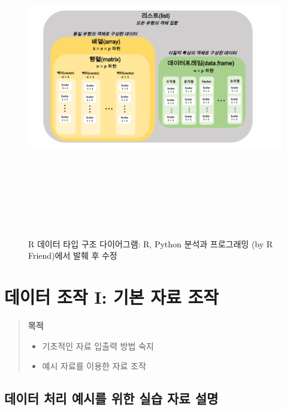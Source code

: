 \documentclass[11pt,a4paper]{book}
\theoremstyle{definition}
\theoremstyle{definition}
\theoremstyle{definition}
\theoremstyle{remark}
\begin{document}
\begin{figure}[H] {
  \centering
  \includegraphics[width = 15cm, height = 14cm]{Figures/datatype-diagram}
  \caption[R 데이터 타입 구조 다이어그램]{R 데이터 타입 구조 다이어그램: R, Python 분석과 프로그래밍 (by R Friend)에서 발췌 후 수정}\label{fig:R-datatype}
} \end{figure}

\vspace{1cm}

\chapter{데이터 조작 I: 기본 자료 조작}\label{--i---}

\begin{quote}
\colorbox{gray!10}{\begin{minipage}{15cm}
\textbf{목적}
\begin{itemize}
  \item 기초적인 자료 입출력 방법 숙지
  \item 예시 자료를 이용한 자료 조작 
\end{itemize}
\end{minipage}}
\end{quote}

\section{데이터 처리 예시를 위한 실습 자료 설명}\label{------}
\end{document}
